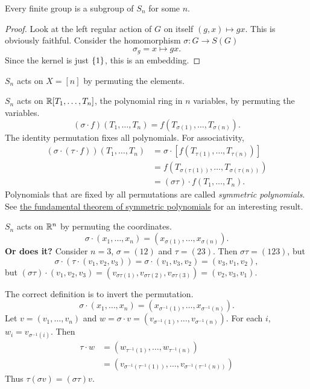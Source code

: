 \begin{corollary*}
    Every finite group is a subgroup of $S_n$ for some $n$.
\end{corollary*}
\begin{proof}
    Look at the left regular action of $G$ on itself
    $(g, x) \mapsto gx$.
    This is obviously faithful.
    Consider the homomorphism $\sigma \colon G \to S(G)$ \[
        \sigma_g = x \mapsto gx.
    \] Since the kernel is just $\{1\}$, this is an embedding.
\end{proof}

\begin{examples}
    \item $S_n$ acts on $X = [n]$ by permuting the elements.
    \item $S_n$ acts on $\mathbb{R}[T_1, \dots, T_n]$, the polynomial ring in $n$
        variables, by permuting the variables. \[
            (\sigma \cdot f)(T_1, \dots, T_n)
                = f(T_{\sigma(1)}, \dots, T_{\sigma(n)}).
        \] The identity permutation fixes all polynomials.
        For associativity, \begin{align*}
            (\sigma \cdot (\tau \cdot f))(T_1, \dots, T_n)
                &= \sigma \cdot [f(T_{\tau(1)}, \dots, T_{\tau(n)})] \\
                &= f(T_{\sigma(\tau(1))}, \dots, T_{\sigma(\tau(n))}) \\
                &= (\sigma \tau) \cdot f(T_1, \dots, T_n).
        \end{align*}
        Polynomials that are fixed by all permutations are
        called \emph{symmetric polynomials}.
        See \href{https://en.wikipedia.org/wiki/Elementary_symmetric_polynomial#Fundamental_theorem_of_symmetric_polynomials}
        {the fundamental theorem of symmetric polynomials}
        for an interesting result.
    \item $S_n$ acts on $\mathbb{R}^n$ by permuting the coordinates. \[
            \sigma \cdot (x_1, \dots, x_n)
                = (x_{\sigma(1)}, \dots, x_{\sigma(n)}).
        \] \textbf{Or does it?}
        Consider $n = 3$, $\sigma = (1 2)$ and $\tau = (2 3)$.
        Then $\sigma \tau = (1 2 3)$, but \[
            \sigma \cdot (\tau \cdot (v_1, v_2, v_3))
                = \sigma \cdot (v_1, v_3, v_2)
                = (v_3, v_1, v_2),
        \] but $(\sigma \tau) \cdot (v_1, v_2, v_3)
        = (v_{\sigma\tau(1)}, v_{\sigma\tau(2)}, v_{\sigma\tau(3)})
        = (v_2, v_3, v_1)$.

        The correct definition is to invert the permutation. \[
            \sigma \cdot (x_1, \dots, x_n)
                = (x_{\sigma^{-1}(1)}, \dots, x_{\sigma^{-1}(n)}).
        \]
        Let $v = (v_1, \dots, v_n)$ and $w = \sigma \cdot v
        = (v_{\sigma^{-1}(1)}, \dots, v_{\sigma^{-1}(n)})$.
        For each $i$, $w_i = v_{\sigma^{-1}(i)}$.
        Then \begin{align*}
            \tau \cdot w
                &= (w_{\tau^{-1}(1)}, \dots, w_{\tau^{-1}(n)}) \\
                &= (v_{\sigma^{-1}(\tau^{-1}(1))}, \dots,
                    v_{\sigma^{-1}(\tau^{-1}(n))})
        \end{align*}
        Thus $\tau (\sigma v) = (\sigma \tau) v$.
\end{examples}
